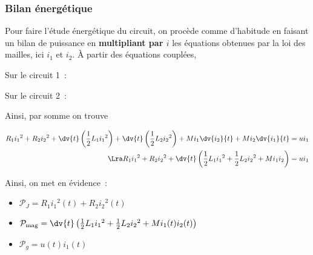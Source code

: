 \documentclass[../main/main.tex]{subfiles}
\begin{document}
\subsubsection{Bilan énergétique}
\label{ssec:cplnrj}
Pour faire l'étude énergétique du circuit, on procède comme d'habitude en
faisant un bilan de puissance en \textbf{multipliant par $i$} les équations
obtenues par la loi des mailles, ici $i_1$ et $i_2$. À partir des équations
couplées,
\smallbreak
\noindent
\begin{minipage}[t]{.5\linewidth}
  \begin{center}
    Sur le circuit 1~:
  \end{center}
  \vspace*{-10pt}
\end{minipage}
\hfill
\begin{minipage}[t]{.5\linewidth}
  \begin{center}
    Sur le circuit 2~:
  \end{center}
  \vspace*{-10pt}
\end{minipage}
\bigbreak
\noindent
Ainsi, par somme on trouve
\begin{hide}
  \begin{align*}
    R_1i_1{}^{2} +R_2i_2{}^{2} +
    \dv{t}\left( \frac{1}{2} L_1i_1{}^{2} \right) +
    \dv{t}\left( \frac{1}{2}L_2i_2{}^{2} \right) +
    Mi_1 \dv{i_2}{t} + Mi_2 \dv{i_1}{t} =
    ui_1
    \\\Lra 
    R_1i_1{}^{2} +R_2i_2{}^{2} +
    \dv{t}\left(
      \frac{1}{2}L_1i_1{}^{2} + \frac{1}{2}L_2i_2{}^{2} + Mi_1i_2
    \right) =
    ui_1
  \end{align*}
\end{hide}
\noindent
Ainsi, on met en évidence~:
\begin{itemize}[label=$\diamond$, leftmargin=10pt]
  \item $\mathcal{P}_{J} = R_1i_1{}^{2}(t) + R_2i_2{}^{2}(t)$
  \item $\mathcal{P}_{\rm mag} = \dv{t}
    \left(
      \frac{1}{2}L_1i_1{}^{2} + \frac{1}{2}L_2i_2{}^{2} + Mi_1(t)i_2(t)
    \right)$
  \item $\mathcal{P}_{g} = u(t)i_1(t)$
\end{itemize}
\end{document}
